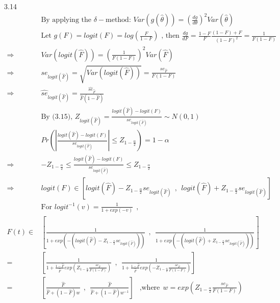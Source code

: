 \documentclass[paper=a4, fontsize=12pt]{scrartcl} %
\numberwithin{equation}{section} %
\numberwithin{figure}{section} %
\numberwithin{table}{section} %
\begin{document}
\newpage
3.14
\begin{align*}
			&	\text{By applying the $\delta-$method: \ \ } Var(g(\widehat{\theta})) = \left( \frac{dg}{d\theta}\right)^2Var(\widehat{\theta}) \\
			&	\text{Let\ \ } g(F) = logit(F) = log(\frac{F}{1-F}) \text{\ \ ,  then\ \ } \frac{dg}{dF}=\frac{1-F}{F}\frac{(1-F)+F}{(1-F)^2} = \frac{1}{F(1-F)}\\
\Rightarrow \ \ \	&	Var(logit(\widehat{F})) = \left( \frac{1}{F(1-F)} \right)^2 Var(\widehat{F})\\
\Rightarrow \ \ \	&	se_{logit(\widehat{F})} = \sqrt{Var(logit(\widehat{F}))} = \frac{se_{\widehat{F}}}{F(1-F)}\\
\Rightarrow \ \ \	&	\widehat{se}_{logit(\widehat{F})} = \frac{\widehat{se}_{\widehat{F}}}{\widehat{F}(1-\widehat{F})}\\
			&	\text{By (3.15), \ \ } Z_{logit(\widehat{F})} = \frac{logit(\widehat{F}) - logit(F)}{se_{logit(\widehat{F})}} \sim N(0, 1)\\
			&	Pr\left( \left|  \frac{logit(\widehat{F}) - logit(F)}{se_{logit(\widehat{F})}} \right| \leq Z_{1-\frac{\alpha}{2}}\right) = 1-\alpha\\
\Rightarrow \ \ \	&	-Z_{1-\frac{\alpha}{2}} \leq \frac{logit(\widehat{F}) - logit(F)}{se_{logit(\widehat{F})}} \leq Z_{1-\frac{\alpha}{2}}\\
\Rightarrow \ \ \	&	logit(F) \in \left[logit(\widehat{F}) - Z_{1-\frac{\alpha}{2}}se_{logit(\widehat{F})}\ \ ,\ \   logit(\widehat{F}) + Z_{1-\frac{\alpha}{2}}se_{logit(\widehat{F})}\right]\\
			&	\text{For\ \ }logit^{-1}(v) = \frac{1}{1+exp(-v)}\ \ , \\
F(t)	\in		&	\left[  \frac{1}{1+exp\left(-(logit(\widehat{F}) - Z_{1-\frac{\alpha}{2}}se_{logit(\widehat{F})})\right)}\ \ ,\ \ \frac{1}{1+exp\left(-(logit(\widehat{F}) + Z_{1-\frac{\alpha}{2}}se_{logit(\widehat{F})})\right)} \right]\\
		=	&	\left[ \frac{1}{1+\frac{1-\widehat{F}}{\widehat{F}}exp\left( Z_{1-\frac{\alpha}{2}} \frac{se_{\widehat{F}}}{F(1-F)} \right)}\ \ , \ \  \frac{1}{1+\frac{1-\widehat{F}}{\widehat{F}}exp\left( -Z_{1-\frac{\alpha}{2}} \frac{se_{\widehat{F}}}{F(1-F)} \right)} \right]\\
		=	&	\left[ \frac{\widehat{F}}{\widehat{F}+(1-\widehat{F})w} \ \ , \ \  \frac{\widehat{F}}{\widehat{F}+(1-\widehat{F})w^{-1}}\right] \ \ \text{\ \ ,where}\ \ w = exp\left( Z_{1-\frac{\alpha}{2}} \frac{se_{\widehat{F}}}{F(1-F)} \right)
\end{align*}
\end{document}
